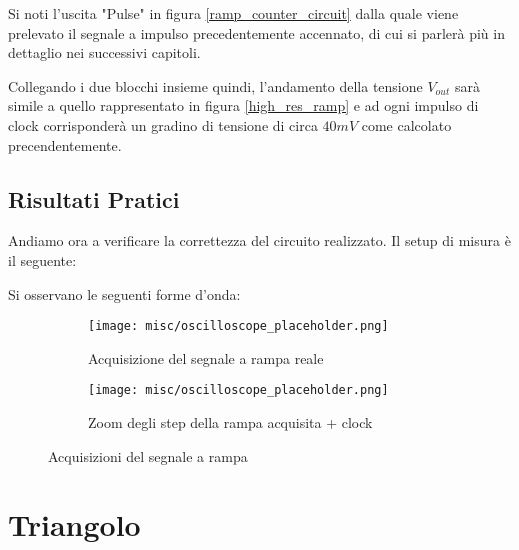 Si noti l'uscita "Pulse" in figura \ref{ramp_counter_circuit} dalla quale viene prelevato
il segnale a impulso precedentemente accennato, di cui si parlerà più in dettaglio nei
successivi capitoli.

Collegando i due blocchi insieme quindi, l'andamento della tensione $V_{out}$ sarà simile a
quello rappresentato in figura \ref{high_res_ramp} e ad ogni impulso di clock corrisponderà
un gradino di tensione di circa $40mV$ come calcolato precendentemente.


\subsection*{Risultati Pratici}


Andiamo ora a verificare la correttezza del circuito realizzato. Il setup di misura è il
seguente:
\medskip


Si osservano le seguenti forme d'onda:
\medskip

\begin{figure}[ht]
    \centering

    \begin{subfigure}{.5\textwidth}
        \centering
        \texttt{[image: misc/oscilloscope\_placeholder.png]}
        \caption{Acquisizione del segnale a rampa reale}
        \label{acq_ramp}
    \end{subfigure}%
    \begin{subfigure}{.5\textwidth}
        \centering
        \texttt{[image: misc/oscilloscope\_placeholder.png]}
        \caption{Zoom degli step della rampa acquisita + clock}
        \label{acq_ramp_steps}
    \end{subfigure}

    \caption{Acquisizioni del segnale a rampa}
    \label{acq_ramp_signals}
\end{figure}


\section{Triangolo}

